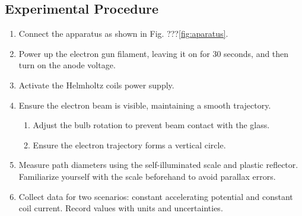 \documentclass[12pt]{article}
\begin{document}
\subsection*{Experimental Procedure}
\begin{enumerate}
    \item Connect the apparatus as shown in Fig. ???\ref{fig:aparatus}.
    \item Power up the electron gun filament, leaving it on for 30 seconds, and then turn on the anode voltage.
    \item Activate the Helmholtz coils power supply.
    \item Ensure the electron beam is visible, maintaining a smooth trajectory.
    \begin{enumerate}
        \item Adjust the bulb rotation to prevent beam contact with the glass.
        \item Ensure the electron trajectory forms a vertical circle.
    \end{enumerate}
    \item Measure path diameters using the self-illuminated scale and plastic reflector. Familiarize yourself with the scale beforehand to avoid parallax errors.
    \item Collect data for two scenarios: constant accelerating potential and constant coil current. Record values with units and uncertainties.
\end{enumerate}
\end{document}
